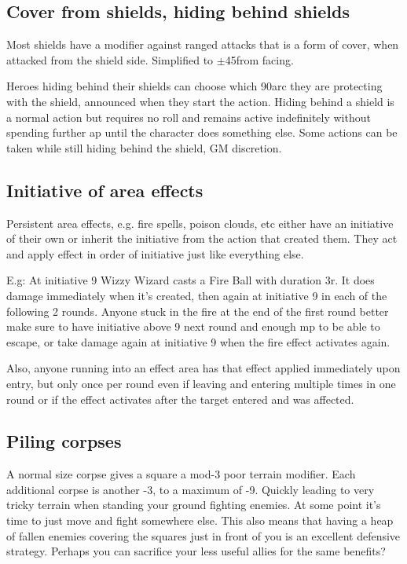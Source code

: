 \subsection*{Cover from shields, hiding behind shields}
Most shields have a modifier against ranged attacks that is a form of cover, when attacked from the shield side. Simplified to $\pm$45\degrees from facing.


Heroes hiding behind their shields can choose which 90\degrees arc they are protecting with the shield, announced when they start the action. Hiding behind a shield is a normal action but requires no roll and remains active indefinitely without spending further ap until the character does something else. Some actions can be taken while still hiding behind the shield, GM discretion.


\subsection*{Initiative of area effects}
Persistent area effects, e.g. fire spells, poison clouds, etc either have an initiative of their own or inherit the initiative from the action that created them. They act and apply effect in order of initiative just like everything else.

E.g: At initiative 9 Wizzy Wizard casts a Fire Ball with duration 3r. It does damage immediately when it's created, then again at initiative 9 in each of the following 2 rounds. Anyone stuck in the fire at the end of the first round better make sure to have initiative above 9 next round and enough mp to be able to escape, or take damage again at initiative 9 when the fire effect activates again.

Also, anyone running into an effect area has that effect applied immediately upon entry, but only once per round even if leaving and entering multiple times in one round or if the effect activates after the target entered and was affected.


\subsection*{Piling corpses}
A normal size corpse gives a square a mod-3 poor terrain modifier. Each additional corpse is another -3, to a maximum of -9. Quickly leading to very tricky terrain when standing your ground fighting enemies. At some point it's time to just move and fight somewhere else. This also means that having a heap of fallen enemies covering the squares just in front of you is an excellent defensive strategy. Perhaps you can sacrifice your less useful allies for the same benefits?

